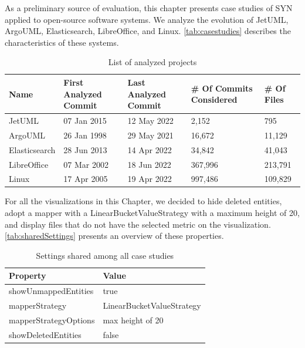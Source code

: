 As a preliminary source of evaluation, this chapter presents case studies of SYN applied to open-source software systems. 
We analyze the evolution of JetUML, ArgoUML, Elasticsearch, LibreOffice, and Linux. 
\autoref{tab:casestudies} describes the characteristics of these systems.

\begin{table}[ht]
	\small
    \centering
    \begin{tabular}{@{}lllll@{}} 
		\toprule
        {\bf Name} & {\bf First Analyzed Commit} & {\bf Last Analyzed Commit} & {\bf \# Of Commits Considered} & {\bf \# Of Files}\\ 
        \midrule
        JetUML & 07 Jan 2015 & 12 May 2022 & 2,152 & 795\\ 
        ArgoUML & 26 Jan 1998 & 29 May 2021 & 16,672 & 11,129 \\
        Elasticsearch & 28 Jun 2013 & 14 Apr 2022 & 34,842 & 41,043 \\
        LibreOffice & 07 Mar 2002 & 18 Jun 2022 & 367,996 & 213,791 \\
        Linux & 17 Apr 2005 & 19 Apr 2022 & 997,486 & 109,829 \\\bottomrule
    \end{tabular}
    \caption{List of analyzed projects}
    \label{tab:casestudies}
\end{table}

For all the visualizations in this Chapter, we decided to hide deleted entities, adopt a mapper with a LinearBucketValueStrategy with a maximum height of 20, and display files that do not have the selected metric on the visualization. 
\autoref{tab:sharedSettings} presents an overview of these properties.

\begin{table}[h]
	\small
    \centering
    \begin{tabular}{@{}ll@{}} 
        \toprule
        \textbf{Property} & \textbf{Value} \\\midrule
        showUnmappedEntities & true\\ 
		mapperStrategy & LinearBucketValueStrategy\\
		mapperStrategyOptions & max height of 20\\
		showDeletedEntities & false \\\bottomrule
    \end{tabular}
    \caption{Settings shared among all case studies}
    \label{tab:sharedSettings}
\end{table}

